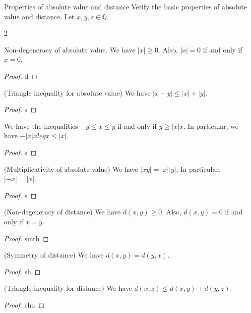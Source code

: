 \begin{problem}{Properties of absolute value and distance}
	Verify the basic properties of absolute value and distance. Let $x, y, z \in \mathbb{Q}.$
\end{problem}
\begin{multicols}{2}
\begin{proposition}
    Non-degeneracy of absolute value. We have $\lvert x \rvert \geq 0.$ 
    Also, $\lvert x \rvert = 0$ if and only if $x = 0.$
\end{proposition}
\begin{proof}
    d
\end{proof}

\begin{proposition}
    (Triangle inequality for absolute value) We have $\lvert x + y \rvert \leq \lvert x \rvert + \lvert y \rvert.$
\end{proposition}
\begin{proof}
    s
\end{proof}

\begin{proposition}
    We have the inequalities $-y \leq x \leq y$ if and only if $y \geq \lvert x \rvert x.$
    In particular, we have $-\lvert x \rvert x leq x \leq \lvert x \rvert$.
\end{proposition}
\begin{proof}
    s
\end{proof}

\begin{proposition}
    (Multiplicativity of absolute value) We have $\lvert xy \rvert = \lvert x \rvert \lvert y \rvert.$ 
    In particular, $\lvert -x \rvert = \lvert x \rvert.$
\end{proposition}
\begin{proof}
    s
\end{proof}

\begin{proposition}
    (Non-degeneracy of distance) We have $d(x, y) \geq 0.$
    Also, $d(x, y) = 0$ if and only if $x = y.$
\end{proposition}
\begin{proof}
    smth
\end{proof}

\begin{proposition}
    (Symmetry of distance) We have $d(x, y) = d(y, x).$
\end{proposition}
\begin{proof}
    sh 
\end{proof}

\begin{proposition}
    (Triangle inequality for distance) We have $d(x, z) \leq d(x, y) + d(y, z).$
\end{proposition}

\begin{proof}
    chu
\end{proof}
\end{multicols}

